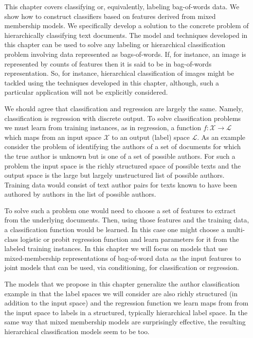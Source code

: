 This chapter covers classifying or, equivalently, labeling bag-of-words data.  We show how to construct classifiers based on features derived from mixed membership models.  We specifically develop a solution to the concrete problem of hierarchically classifying text documents.  The model and techniques developed in this chapter can be used to solve any labeling or hierarchical classification problem involving data represented as bags-of-words.  If, for instance,  an image is represented by counts of features then it is said to be in bag-of-words representation.   So, for instance, hierarchical classification of images might be tackled using the techniques developed in this chapter, although, such a particular application will not be explicitly considered.

We should agree that classification and regression are largely the same.  Namely, classification is regression with discrete output.  To solve classification problems we must learn from training instances, as in regression, a function $f : \mathcal{X} \rightarrow \mathcal{L}$ which maps from an input space $\mathcal{X}$ to an output (label) space $\mathcal{L}$.   As an example consider the problem of identifying the authors of a set of documents for which the true author is unknown but is one of a set of possible authors.   For such a problem the input space is the richly structured space of possible texts and the output space is the large but largely unstructured list of possible authors.  Training data would consist of text author pairs for texts known to have been authored by authors in the list of possible authors.

To solve such a problem one would need to choose a set of features to extract from the underlying documents. Then, using those features and the training data, a classification function would be learned.  In this case one might choose a multi-class logistic or probit regression function and learn parameters for it from the labeled training instances.   In this chapter we will focus on models that use mixed-membership representations of bag-of-word data as the input features to joint models that can be used, via conditioning, for classification or regression.

The models that we propose in this chapter generalize the author classification example in that the label spaces we will consider are also richly structured (in addition to the input space) and the regression function we learn maps from from the input space to labels in a structured, typically hierarchical label space.  In the same way that mixed membership models are surprisingly effective, the resulting hierarchical classification models seem to be too.

